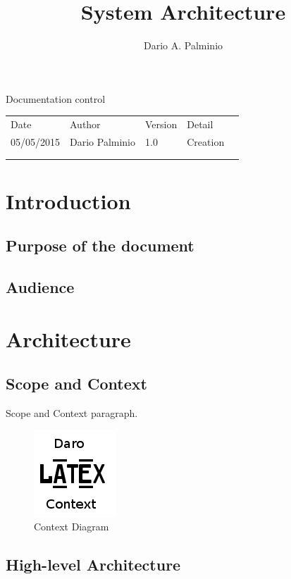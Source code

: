\documentclass[a4paper,11pt]{book}
\title{System Architecture}
\author{Dario A. Palminio}
\begin{document}
\maketitle

Documentation control

\begin{table}[h]
\begin{tabular}{lllll}
\cline{1-4}
\multicolumn{1}{|l|}{Date}       & \multicolumn{1}{l|}{Author}         & \multicolumn{1}{l|}{Version} & \multicolumn{1}{l|}{Detail}   &  \\ \cline{1-4}
\multicolumn{1}{|l|}{05/05/2015} & \multicolumn{1}{l|}{Dario Palminio} & \multicolumn{1}{l|}{1.0}     & \multicolumn{1}{l|}{Creation} &  \\ \cline{1-4}
                                 &                                     &                              &                               &  \\
                                 &                                     &                              &                               & 
\end{tabular}
\end{table}

\tableofcontents

\chapter{Introduction}

\section{Purpose of the document}

\section{Audience}

\chapter{Architecture}

\section{Scope and Context}

Scope and Context paragraph.

\begin{figure}[h] %
  \includegraphics{image_001}
  \caption{Context Diagram}
  \centering
  \label{fig:context} %
\end{figure}

\section{High-level Architecture}
\end{document}
